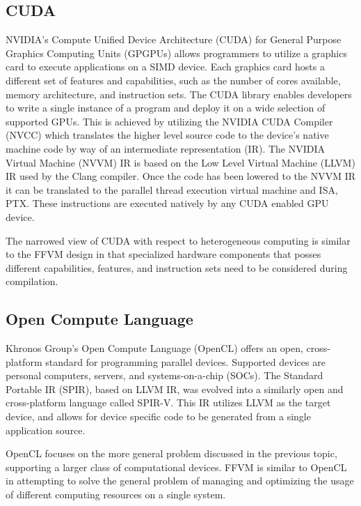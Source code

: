 \subsection{CUDA}
\label{related:cuda}
NVIDIA's Compute Unified Device Architecture (CUDA) \cite{cuda} for General
Purpose Graphics Computing Units (GPGPUs) allows programmers to utilize a
graphics card to execute applications on a SIMD device. Each graphics card
hosts a different set of features and capabilities, such as the number of cores
available, memory architecture, and instruction sets. The CUDA library
enables developers to write a single instance of a program and deploy
it on a wide selection of supported GPUs. This is achieved by utilizing the
NVIDIA CUDA Compiler (NVCC) which translates the higher level source code
to the device's native machine code by way of an intermediate representation
(IR). The NVIDIA Virtual Machine (NVVM) IR is based on the Low Level Virtual
Machine (LLVM) IR used by the Clang compiler. Once the code has been lowered
to the NVVM IR it can be translated to the parallel thread execution virtual
machine and ISA, PTX. These instructions are executed natively by any CUDA
enabled GPU device.

The narrowed view of CUDA with respect to heterogeneous computing is similar to
the FFVM design in that specialized hardware components that posses different
capabilities, features, and instruction sets need to be considered during
compilation.

\subsection{Open Compute Language}
\label{related:ocl}
Khronos Group's Open Compute Language (OpenCL) \cite{opencl} offers an open,
cross-platform standard for programming parallel devices. Supported devices are
personal computers, servers, and systems-on-a-chip (SOCs). The Standard
Portable IR (SPIR), based on LLVM IR, was evolved into a similarly open and
cross-platform language called SPIR-V. This IR utilizes LLVM as the target
device, and allows for device specific code to be generated from a single
application source.

OpenCL focuses on the more general problem discussed in
the previous topic, supporting a larger class of computational devices. FFVM is
similar to OpenCL in attempting to solve the general problem of managing and
optimizing the usage of different computing resources on a single system.

